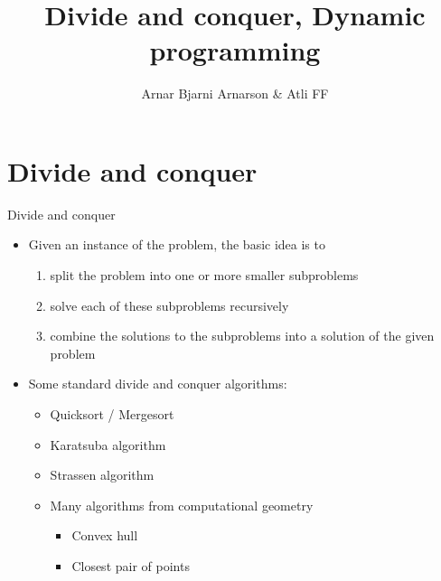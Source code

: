 \documentclass{beamer}
\title{Divide and conquer, Dynamic programming}
\author{Arnar Bjarni Arnarson \& Atli FF}
\institute{\href{http://ru.is/td}{School of Computer Science} \\[2pt] \href{http://ru.is}{Reykjavík University}}
\begin{document}
\maketitle

\section{Divide and conquer}
\begin{frame}[plain]{Divide and conquer}
    \begin{itemize}
        \item Given an instance of the problem, the basic idea is to
        \begin{enumerate}
            \item split the problem into one or more smaller subproblems
            \item solve each of these subproblems recursively
            \item combine the solutions to the subproblems into a solution of the given problem
        \end{enumerate}

        \vspace{5pt}

        \item Some standard divide and conquer algorithms:
        \begin{itemize}
            \item Quicksort / Mergesort
            \item Karatsuba algorithm
            \item Strassen algorithm
            \item Many algorithms from computational geometry
                \begin{itemize}
                    \item Convex hull
                    \item Closest pair of points
                \end{itemize}
        \end{itemize}
    \end{itemize}
\end{frame}
\end{document}
